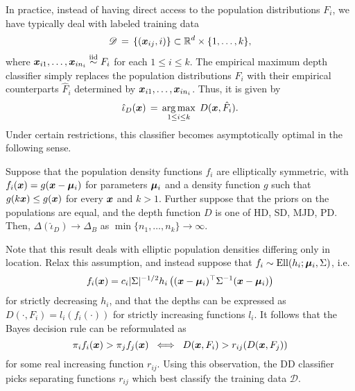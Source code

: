 In practice, instead of having direct access to the population distributions
$F_i$, we have typically deal with labeled training data
\begin{equation}
    \mathscr{D} \,=\, \{(\bm{x}_{ij}, i)\} \subset \mathbb{R}^d \times \{1, \dots, k\},
\end{equation}
where $\bm{x}_{i1}, \dots, \bm{x}_{in_i} \overset{\text{iid}}{\sim} F_i$ for each $1 \leq i \leq k$.
The empirical maximum depth classifier simply replaces the population
distributions $F_i$ with their empirical counterparts $\hat{F}_i$ determined
by $\bm{x}_{i1}, \dots, \bm{x}_{in_i}$. Thus, it is given by
\begin{equation}
    \hat{\iota}_{D}(\bm{x}) \,=\, \operatorname*{arg\,max}_{1 \leq i \leq k}\; D(\bm{x}, \hat{F}_i).
\end{equation}
Under certain restrictions, this classifier becomes asymptotically optimal in
the following sense.

\begin{theorem}
    Suppose that the population density functions $f_i$ are elliptically
    symmetric, with $f_i(\bm{x}) = g(\bm{x} - \bm{\mu}_i)$ for parameters $\bm{\mu}_i$ and a
    density function $g$ such that $g(k\bm{x}) \leq g(\bm{x})$ for every $\bm{x}$ and
    $k > 1$. Further suppose that the priors on the populations are equal, and
    the depth function $D$ is one of HD, SD, MJD, PD. Then,
    $\Delta(\hat{\iota}_{D}) \to \Delta_B$ as $\min\{n_1, \dots,
    n_k\} \to \infty$.
\end{theorem}

Note that this result deals with elliptic population densities differing only
in location.
Relax this assumption, and instead suppose that $f_i \sim \operatorname{Ell}(h_i; \bm{\mu}_i,
\Sigma)$, i.e.
\begin{equation}
    f_i(\bm{x}) = c_i |\Sigma|^{-1/2} h_i\left((\bm{x} - \bm{\mu}_i)^\top \Sigma^{-1} (\bm{x} - \bm{\mu}_i)\right)
\end{equation}
for strictly decreasing $h_i$, and that the depths can be expressed as
$D(\cdot, F_i) = l_i(f_i(\cdot))$ for strictly increasing functions $l_i$.
It follows that the Bayes decision rule can be reformulated as
\begin{equation}
    \pi_i f_i(\bm{x}) > \pi_j f_j(\bm{x}) \;\iff\; D(\bm{x}, F_i) > r_{ij}(D(\bm{x}, F_j))
\end{equation}
for some real increasing function $r_{ij}$.
Using this observation, the DD classifier \parencite{li-albertos-liu-2012}
picks separating functions $r_{ij}$ which best classify the training data
$\mathscr{D}$.

